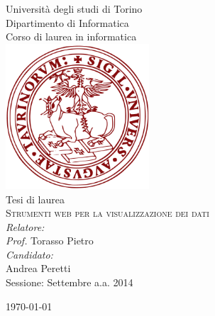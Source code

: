 \begin{titlepage}
\begin{center}

{\LARGE Università degli studi di Torino}\\
{Dipartimento di Informatica}\\[1cm]

{\Large Corso di laurea in informatica}\\[0.5cm]
\includegraphics[width=0.40\textwidth]{img/unitologo.png}~\\[0.5cm]

{Tesi di laurea}\\[1cm]
\textsc{\LARGE Strumenti web per la visualizzazione dei dati}\\[1.5cm]


{\emph{Relatore:}}\\
{\emph{Prof.} Torasso Pietro}\\[1cm]

{\emph{Candidato:}}\\
{Andrea Peretti}\\[1.5cm]
{\Large Sessione:}
{Settembre a.a. 2014}




\vfill

{\large \today}

\end{center}
\end{titlepage}
